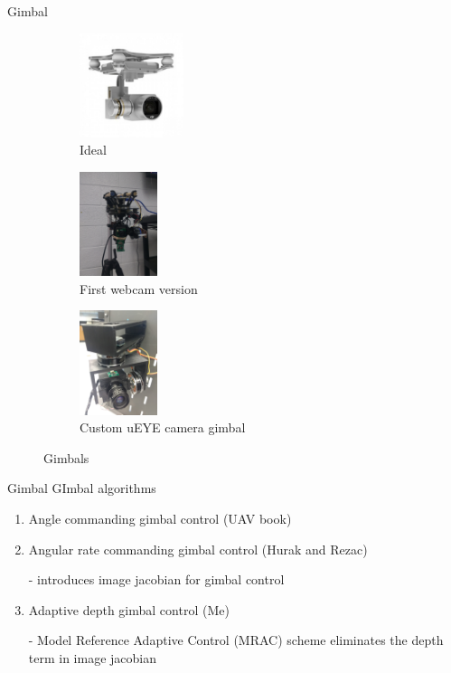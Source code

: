 \documentclass[9pt]{beamer}
\newenvironment{figure*}%
{\begin{figure}}
{\end{figure}}
\begin{document}
\begin{frame}{Gimbal}
	\begin{figure}[htbp]
	\centering
	\begin{subfigure}[t]{0.3\textwidth}
		\centering
		\includegraphics[height=1.2in]{phantom3_gimbal.jpg}
		\caption{Ideal}
	\end{subfigure}%
	\begin{subfigure}[t]{0.3\textwidth}
		\centering
		\includegraphics[height=1.2in]{chapter2/gimbal_webcam.jpg}
		\caption{First webcam version}
	\end{subfigure}
	\begin{subfigure}[t]{0.3\textwidth}
		\centering
		\includegraphics[height=1.2in]{chapter2/gimbal.jpg}
		\caption{Custom uEYE camera gimbal}
	\end{subfigure}
	\caption{Gimbals}
	\end{figure}
\end{frame}

\begin{frame}{Gimbal}
	GImbal algorithms
	\begin{enumerate}
		\item Angle commanding gimbal control (UAV book)
		\item Angular rate commanding gimbal control (Hurak and Rezac)
		
		 - introduces image jacobian for gimbal control
		\item Adaptive depth gimbal control (Me)
		
		 - Model Reference Adaptive Control (MRAC) scheme eliminates the depth term in image jacobian
	\end{enumerate}
\end{frame}
\end{document}
